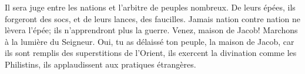 Il sera juge entre les nations et l’arbitre de peuples nombreux.
De leurs épées, ils forgeront des socs, et de leurs lances, des faucilles.
	Jamais nation contre nation ne lèvera l’épée; ils n’apprendront plus la guerre.
Venez, maison de Jacob! Marchons à la lumière du Seigneur.
Oui, tu as délaissé ton peuple, la maison de Jacob,
	car ils sont remplis des superstitions de l’Orient,
	ils exercent la divination comme les Philistins,
	ils applaudissent aux pratiques étrangères.
